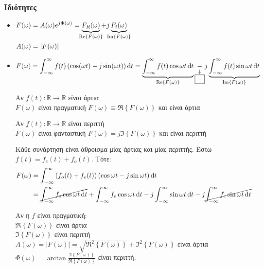      \subsubsection{Ιδιότητες}
     \begin{itemize}

     \item\(
     \begin{aligned}[t]
     F(\omega)&= A(\omega )e^{j\Phi(\omega )} =
     \underbrace{F_R(\omega )}_{\mathclap{\Re\left\lbrace F(\omega ) \right\rbrace}}
     +j\underbrace{F_i(\omega )}_{\mathclap{\Im\left\lbrace F(\omega ) \right\rbrace}}
     \\ A(\omega )&=\left| F(\omega ) \right|
     \end{aligned}\)
     \item \( \displaystyle
     F(\omega )=\int_{-\infty}^{\infty} f(t)\left(\cos(\omega t)-j\sin(\omega t)\right)
     \dif t = \underbrace{\int_{-\infty}^{\infty} f(t)\cos\omega t\dif t}_{%
        \Re\left\lbrace F(\omega ) \right\rbrace
        }
        \underset{\substack{\downarrow\\\boxed{-}}}{-}
        j \underbrace{\int_{-\infty}^{\infty} f(t)\sin\omega t\dif t}_{%
            \Im\left\lbrace F(\omega ) \right\rbrace
            }
     \)

     Αν \( f(t):\mathbb R \to\mathbb R  \) είναι άρτια\\
     \( F(\omega ) \) είναι πραγματική \quad \(
     F(\omega ) \equiv \Re\left\lbrace F(\omega ) \right\rbrace
      \) και είναι άρτια

     Αν \( f(t):\mathbb R \to\mathbb R  \) είναι περιττή\\
     \( F(\omega ) \) είναι φανταστική \quad \(
     F(\omega ) = j\Im \left\lbrace F(\omega) \right\rbrace
      \) και είναι περιττή

     Κάθε συνάρτηση είναι άθροισμα μίας άρτιας και μίας περιττής. Έστω
     \( f(t) = f_e(t)+f_o(t) \). Τότε:
     \begin{align*}
     F(\omega ) &= \int_{-\infty}^{\infty} \left(
     f_o(t)+f_e(t)
     \right)(\cos\omega t -j\sin \omega t)\mathop{}\!\mathrm{d} t
     \\ &= \cancel{\int_{-\infty}^{\infty} f_o\cos\omega t\mathop{}\!\mathrm{d} t}
     + \int_{-\infty}^{\infty} f_e\cos\omega t\mathop{}\!\mathrm{d} t
     - j\int_{-\infty}^{\infty} \sin\omega t\mathop{}\!\mathrm{d} t
     - j \cancel{\int_{-\infty}^{\infty} f_e\sin\omega t\mathop{}\!\mathrm{d} t }
     \end{align*}

     Αν η \( f \) είναι πραγματική: \\
     \( \Re\left\lbrace F(\omega ) \right\rbrace \) είναι άρτια \\
     \( \Im\left\lbrace F(\omega ) \right\rbrace \) είναι περιττή \\
     \( A(\omega)=\left|F(\omega )\right| =
     \sqrt{\Re^2\left\lbrace F(\omega ) \right\rbrace}
     +\Im^2\left\lbrace F(\omega) \right\rbrace
      \) είναι άρτια\\
      \( \Phi(\omega) =\arctan
      \frac{\Im\left\lbrace F(\omega) \right\rbrace}%
      {\Re\left\lbrace F(\omega ) \right\rbrace}
       \) είναι περιττή.


\end{itemize}
